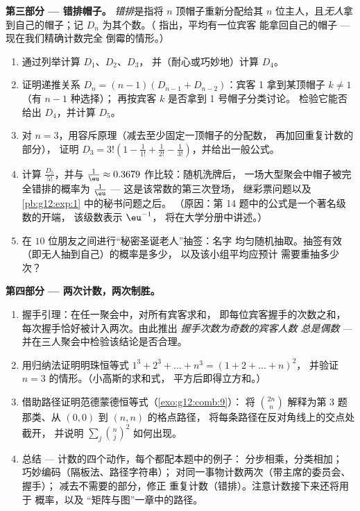 \begin{problem}
\medskip
\noindent\textbf{第三部分 --- 错排帽子。}
\emph{错排}是指将 $n$ 顶帽子重新分配给其
$n$ 位主人，且\emph{无人}拿到自己的帽子；记
$D_n$ 为其个数。（ 指出，平均有一位宾客
能拿回自己的帽子 --- 现在我们精确计数完全
倒霉的情形。）
\begin{enumerate}[resume]
  \item 通过列举计算 $D_1$、$D_2$、$D_3$，
        并（耐心或巧妙地）计算 $D_4$。
  \item 证明递推关系
        $D_n = (n - 1)\left(D_{n-1} + D_{n-2}\right)$：宾客 1
        拿到某顶帽子 $k \neq 1$（有 $n - 1$ 种选择）；
        再按宾客 $k$ 是否拿到 1 号帽子分类讨论。
        检验它能否给出 $D_4$，并计算 $D_5$。
  \item 对 $n = 3$，用容斥原理（减去至少固定一顶帽子的分配数，
        再加回重复计数的部分），
        证明
        $D_3 = 3!\left(1 - \frac{1}{1!} + \frac{1}{2!} -
        \frac{1}{3!}\right)$，并给出一般公式。
  \item 计算 $\frac{D_5}{5!}$，并与
        $\frac1\eu \approx 0.3679$ 作比较：随机洗牌后，
        一场大型聚会中帽子被完全错排的概率为
        $\frac1\eu$ --- 这是该常数的第三次登场，
        继彩票问题以及 \cref{pb:g12:exp:1} 中的秘书问题之后。
        （原因：第 14 题中的公式是一个著名级数的开端，
        该级数表示 $\eu^{-1}$，
        将在大学分册中讲述。）
  \item 在 $10$ 位朋友之间进行“秘密圣诞老人”抽签：名字
        均匀随机抽取。抽签有效（即无人抽到自己）的概率是多少，
        以及该小组平均应预计
        需要重抽多少次？
\end{enumerate}

\medskip
\noindent\textbf{第四部分 --- 两次计数，两次制胜。}
\begin{enumerate}[resume]
  \item 握手引理：在任一聚会中，对所有宾客求和，
        即每位宾客握手的次数之和，每次握手恰好被计入两次。由此推出
        \emph{握手次数为奇数的宾客人数
        总是偶数} ---
        并在三人聚会中检验该结论是否合理。
  \item 用归纳法证明明珠恒等式
        $1^3 + 2^3 + \dots + n^3 = (1 + 2 + \dots + n)^2$，
        并验证 $n = 3$ 的情形。（小高斯的求和式，
        平方后即得立方和。）
  \item 借助路径证明范德蒙德恒等式（\cref{exo:g12:comb:9}）：
        将 $\binom{2n}{n}$ 解释为第 3 题那类、从 $(0,0)$ 到 $(n,n)$ 的格点路径，
        将每条路径在反对角线上的交点处截开，
        并说明
        $\sum_j \binom nj^2$ 如何出现。
  \item 总结 --- 计数的四个动作，每个都配本题中的例子：
        分步相乘，分类相加；
        巧妙编码（隔板法、路径字符串）；
        对同一事物计数两次（带主席的委员会、握手）；
        减去不需要的部分，修正
        重复计数（错排）。注意计数接下来还将用于
        概率，以及
        “矩阵与图”一章中的路径。
\end{enumerate}
\end{problem}
